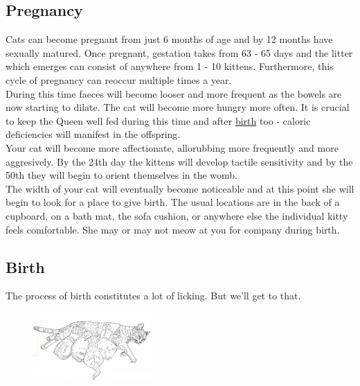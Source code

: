 \documentclass{article}
\begin{document}
\subsection*{Pregnancy}
Cats can become pregnant from just 6 months of age and by 12 months have sexually matured. Once pregnant, \gls{gestation} takes from 63 - 65 days and the litter which emerges can consist of anywhere from 1 - 10 kittens. Furthermore, this cycle of pregnancy can reoccur multiple times a year.\\

During this time faeces will become looser and more frequent as the bowels are now starting to dilate. The cat will become more hungry more often. It is crucial to keep the Queen well fed during this time and after \hyperref[sec:Birth]{birth} too - caloric deficiencies will manifest in the offspring.\\

Your cat will become more affectionate, allorubbing more frequently and more aggresively. By the 24th day the kittens will develop tactile sensitivity and by the 50th they will begin to orient themselves in the womb.\\

The width of your cat will eventually become noticeable and at this point she will begin to look for a place to give birth. The usual locations are in the back of a cupboard, on a bath mat, the sofa cushion, or anywhere else the individual kitty feels comfortable. She may or may not meow at you for company during birth.

\subsection*{Birth}
\label{sec:Birth}

\fancyfoot[L,R]{}

The process of birth constitutes a lot of licking. But we'll get to that.\\
\begin{figure}
    \centering
    \includegraphics[width=0.4\textwidth]{img/cat-mum.png}
\end{figure}
\end{document}
